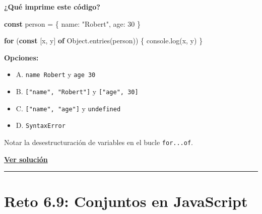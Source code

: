 \documentclass[
  letterpaper,
  DIV=11,
  numbers=noendperiod]{scrreprt}
\newenvironment{Shaded}{\begin{snugshade}}{\end{snugshade}}
\newcommand{\BuiltInTok}[1]{\textcolor[rgb]{0.00,0.23,0.31}{#1}}
\newcommand{\ControlFlowTok}[1]{\textcolor[rgb]{0.00,0.23,0.31}{\textbf{#1}}}
\newcommand{\DataTypeTok}[1]{\textcolor[rgb]{0.68,0.00,0.00}{#1}}
\newcommand{\DecValTok}[1]{\textcolor[rgb]{0.68,0.00,0.00}{#1}}
\newcommand{\FunctionTok}[1]{\textcolor[rgb]{0.28,0.35,0.67}{#1}}
\newcommand{\KeywordTok}[1]{\textcolor[rgb]{0.00,0.23,0.31}{\textbf{#1}}}
\newcommand{\NormalTok}[1]{\textcolor[rgb]{0.00,0.23,0.31}{#1}}
\newcommand{\OperatorTok}[1]{\textcolor[rgb]{0.37,0.37,0.37}{#1}}
\newcommand{\StringTok}[1]{\textcolor[rgb]{0.13,0.47,0.30}{#1}}
\providecommand{\tightlist}{%
  \setlength{\itemsep}{0pt}\setlength{\parskip}{0pt}}
\begin{document}
\textbf{¿Qué imprime este código?}

\begin{Shaded}
\begin{Highlighting}[]
\KeywordTok{const}\NormalTok{ person }\OperatorTok{=}\NormalTok{ \{}
  \DataTypeTok{name}\OperatorTok{:} \StringTok{"Robert"}\OperatorTok{,}
  \DataTypeTok{age}\OperatorTok{:} \DecValTok{30}
\NormalTok{\}}

\ControlFlowTok{for}\NormalTok{ (}\KeywordTok{const}\NormalTok{ [x}\OperatorTok{,}\NormalTok{ y] }\KeywordTok{of} \BuiltInTok{Object}\OperatorTok{.}\FunctionTok{entries}\NormalTok{(person)) \{}
  \BuiltInTok{console}\OperatorTok{.}\FunctionTok{log}\NormalTok{(x}\OperatorTok{,}\NormalTok{ y)}
\NormalTok{\}}
\end{Highlighting}
\end{Shaded}

\textbf{Opciones:}

\begin{itemize}
\tightlist
\item
  A. \texttt{name\ Robert} y \texttt{age\ 30}
\item
  B. \texttt{{[}"name",\ "Robert"{]}} y \texttt{{[}"age",\ 30{]}}
\item
  C. \texttt{{[}"name",\ "age"{]}} y \texttt{undefined}
\item
  D. \texttt{SyntaxError}
\end{itemize}

\begin{tcolorbox}[enhanced jigsaw, left=2mm, toprule=.15mm, leftrule=.75mm, breakable, colback=white, coltitle=black, bottomtitle=1mm, arc=.35mm, rightrule=.15mm, colframe=quarto-callout-tip-color-frame, opacitybacktitle=0.6, toptitle=1mm, opacityback=0, titlerule=0mm, title=\textcolor{quarto-callout-tip-color}{\faLightbulb}\hspace{0.5em}{Pista}, bottomrule=.15mm, colbacktitle=quarto-callout-tip-color!10!white]

Notar la desestructuración de variables en el bucle \texttt{for...of}.

\end{tcolorbox}

\textbf{\hyperref[sec-sol-cap6-reto8]{Ver solución}}

\begin{center}\rule{0.5\linewidth}{0.5pt}\end{center}

\section{Reto 6.9: Conjuntos en JavaScript}\label{sec-cap6-reto9}
\end{document}
